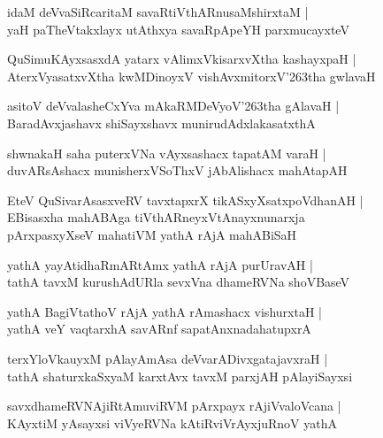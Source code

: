 \documentclass[twoside,12pt,openright]{book}
\def\S{\char'263}
\newcounter{shloka}[chapter]
\begin{document}
\begin{shloka}
idaM deVvaSiRcaritaM savaRtiVthARnusaMshirxtaM |\\
yaH paTheVtakxlayx utAthxya savaRpApeYH parxmucayxteV
\end{shloka}

\begin{shloka}
QuSimuKAyxsasxdA yatarx vAlimxVkisarxvXtha kashayxpaH |\\
AterxVyasatxvXtha kwMDinoyxV vishAvxmitorxV\S tha gwlavaH 
\end{shloka}

\begin{shloka}
asitoV deVvalasheCxYva mAkaRMDeVyoV\S tha gAlavaH |\\
BaradAvxjashavx shiSayxshavx munirudAdxlakasatxthA
\end{shloka}

\begin{shloka}
shwnakaH saha puterxVNa vAyxsashacx tapatAM varaH |\\
duvARsAshacx munisherxVSoThxV jAbAlishacx mahAtapAH 
\end{shloka}

\begin{shloka}
EteV QuSivarAsasxveRV tavxtapxrX tikASxyXsatxpoVdhanAH |\\
EBisasxha mahABAga tiVthARneyxVtAnayxnunarxja \\
pArxpasxyXseV mahatiVM  yathA rAjA mahABiSaH  
\end{shloka}

\begin{shloka}
yathA yayAtidhaRmARtAmx yathA rAjA purUravAH |\\
tathA tavxM kurushAdURla sevxVna dhameRVNa shoVBaseV 
\end{shloka}

\begin{shloka}
yathA BagiVtathoV rAjA yathA rAmashacx vishurxtaH |\\
yathA veY vaqtarxhA savARnf sapatAnxnadahatupxrA 
\end{shloka}

\begin{shloka}
terxYloVkauyxM pAlayAmAsa deVvarADivxgatajavxraH |\\
tathA shaturxkaSxyaM karxtAvx tavxM parxjAH pAlayiSayxsi 
\end{shloka}

\begin{shloka}
savxdhameRVNAjiRtAmuviRVM pArxpayx rAjiVvaloVcana |\\
KAyxtiM yAsayxsi viVyeRVNa kAtiRviVrAyxjuRnoV yathA 
\end{shloka}
\end{document}
